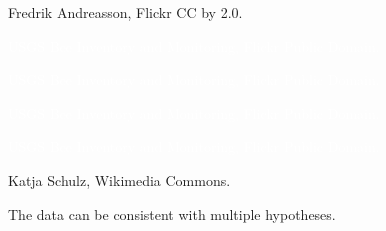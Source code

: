 \documentclass[t]{beamer}
\begin{document}
{
\begin{frame}[b,plain]{}
\tiny Fredrik Andreasson, Flickr CC by 2.0.
\end{frame}
}

{
\begin{frame}[b]

\hfill\tiny\textcolor{white}{USGS Bee Inventory and Monitoring, Flickr Public Domain.}
\end{frame}
}

{
\begin{frame}[b]

\hfill\tiny\textcolor{white}{USGS Bee Inventory and Monitoring, Flickr Public Domain.}
\end{frame}
}

{
\begin{frame}[b]

\hfill\tiny\textcolor{white}{USGS Bee Inventory and Monitoring, Flickr Public Domain.}
\end{frame}
}


{
\begin{frame}[b]

\hfill\tiny\textcolor{white}{USGS Bee Inventory and Monitoring, Flickr Public Domain.}
\end{frame}
}



{
\begin{frame}[b,plain]{}
\end{frame}
}


{
\begin{frame}[b]

\hfill\tiny Katja Schulz, Wikimedia Commons.
\end{frame}
}

{
\begin{frame}[b]{The data can be consistent with multiple hypotheses.}

\end{frame}
}
\end{document}
